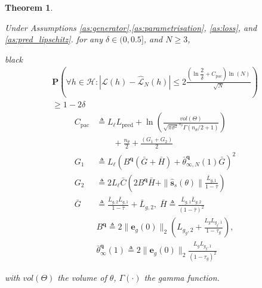 \documentclass{ifacconf}
\def\eqref#1{(\ref{#1})}
\def\rve{{\mathbf{e}}}
\def\rvq{{\mathbf{q}}}
\def\rvv{{\mathbf{v}}}
\def\vs{{\bm{s}}}
\def\sR{{\mathbb{R}}}
\newcommand{\E}{\mathbb{E}}
\newcommand{\KL}{D_{\mathrm{KL}}}
\newcommand{\bP}{\mathbf{P}}
\newtheorem{Theorem}{Theorem}[section]
\newcommand{\class}{\(\mathcal{SI}\)}
\newcommand{\deividas}[1]{\textcolor{black}{ #1}} %
\begin{document}
\begin{Theorem}\label{thm:mainThm} %

	Under Assumptions \ref{as:generator},\ref{as:parametrisation}, \ref{as:loss}, and \ref{as:pred_lipschitz}.  
	for any $\delta\in(0,0.5]$, and $N \ge 3$, 
  \begin{color}{black}
    \begin{multline} \label{eq:mainThmIneq}
         \bP\left(\forall  h \in \mathcal{H}: |\mathcal{L} (h)-\hat{\mathcal{L}}_N(h)| \le 2\frac{(\ln\dfrac{2}{\delta}	+ C_{\text{pac}}) \ln(N)}{\sqrt{N}}\right)\\ \ge 1-2\delta
    \end{multline}
\begin{equation}\label{eq:G1G2}
\begin{split}
    C_{\text{pac}} &\triangleq 
    L_{\ell}L_{\text{pred}} +  \ln\left(\frac{vol(\Theta)}{\sqrt{\pi \sigma^2}^{n_{\theta}} \Gamma(n_{\theta}/2+1)}\right)\\
    &\qquad + \frac{n_{\theta}}{2} + 
     \frac{(G_1+G_2)}{2} \\
    G_1 & \triangleq L_{\ell}\left( B^{\rvq}\left(\bar{G}+\bar{H} \right) +\bar{\theta}_{\infty,N}^{\rvq}(1) \bar{G} \right)^2 \\
    G_2 & \triangleq 2L_{\ell}\bar{C} \left( 2 B^\rvq \bar{H} +\|\hat{\vs}_{s}(\theta)\|\frac{\bar{L}_{g,1}}{1-\bar{\tau}} \right) \\
  \bar{G} &\triangleq \frac{\bar{L}_{g,2}\bar{L}_{g,1}}{1-\bar{\tau}}+\bar{L}_{g,2},\; \bar{H}\triangleq \frac{\bar{L}_{g,1} \bar{L}_{g,2}}{(1-\bar{\tau})^2} \\
  & B^{\rvq} \triangleq 2\|\rve_g(0)\|_2 \left ( L_{g_g,2}+\frac{L_{g}L_{g_g,1}}{1-\tau_g}\right ),  \\
   & \bar{\theta}_{\infty}^{\rvq}(1) \triangleq 2\|\rve_g(0)\|_2 \frac{L_{g}L_{g_g,1}}{(1-\tau_g)^2}
\end{split}
\end{equation}
\end{color}
with $vol(\Theta)$ the volume of $\theta$, $\Gamma(\cdot)$ the gamma function. %
\end{Theorem}
\end{document}
